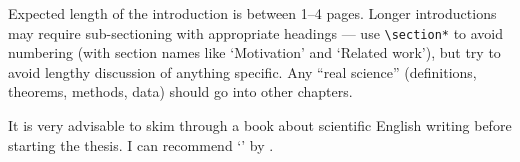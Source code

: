 Expected length of the introduction is between 1--4 pages. Longer introductions may require sub-sectioning with appropriate headings --- use \texttt{\textbackslash{}section*} to avoid numbering (with section names like `Motivation' and `Related work'), but try to avoid lengthy discussion of anything specific. Any ``real science'' (definitions, theorems, methods, data) should go into other chapters.

It is very advisable to skim through a book about scientific English writing before starting the thesis. I can recommend `' by \citet{glasman2010science}.
\fi